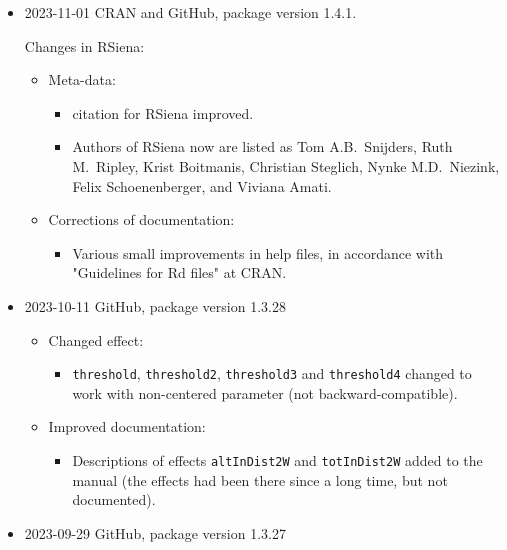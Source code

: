 \documentclass[a4paper,fleqn,11pt]{article}
\newcommand{\+}{\, + \,}
\newcommand{\sfn}[1]{\textsf{#1}}
\newcommand{\RS}{{\sf \textsf{RSiena} }}
\begin{document}
\begin{small}
\begin{itemize}
\item 2023-11-01 CRAN and GitHub, package version 1.4.1.


Changes in RSiena:
\begin{itemize}
\item Meta-data:
   \begin{itemize}
   \item \sfn{citation} for \RS improved.
   \item Authors of \RS now are listed as
   Tom A.B.\ Snijders, Ruth M.\ Ripley, Krist Boitmanis, Christian
  Steglich, Nynke M.D.\ Niezink, Felix Schoenenberger, and Viviana
  Amati.
    \end{itemize}
\item Corrections of documentation:
   \begin{itemize}
   \item Various small improvements in help files,
      in accordance with "Guidelines for Rd files" at CRAN.
    \end{itemize}
\end{itemize}

\item 2023-10-11 GitHub, package version 1.3.28
\begin{itemize}
\item Changed effect:
   \begin{itemize}
  \item \texttt{threshold}, \texttt{threshold2}, \texttt{threshold3} and \texttt{threshold4}
    changed to work with non-centered parameter (not backward-compatible).
    \end{itemize}
\item Improved documentation:
   \begin{itemize}
  \item Descriptions of effects \texttt{altInDist2W} and \texttt{totInDist2W} added
  to the manual (the effects had been there since a long time, but not documented).
    \end{itemize}
\end{itemize}


\item 2023-09-29 GitHub, package version 1.3.27



\end{itemize}
\end{small}
\end{document}
